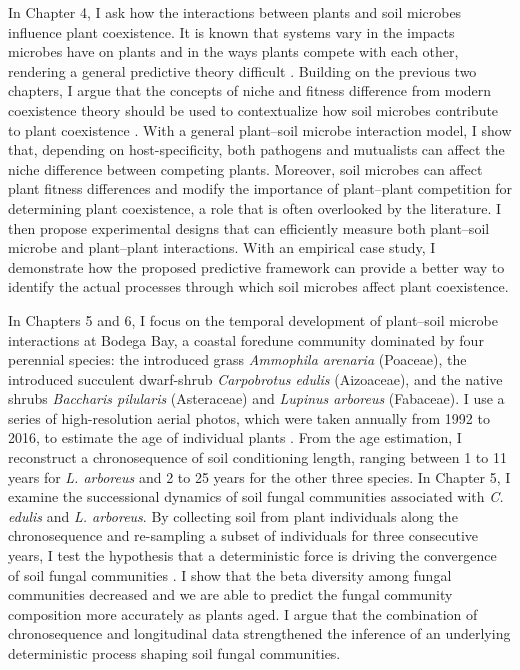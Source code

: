 In Chapter 4, I ask how the interactions between plants and soil microbes influence plant coexistence. It is known that systems vary in the impacts microbes have on plants and in the ways plants compete with each other, rendering a general predictive theory difficult \citep{Lekberg2018}. Building on the previous two chapters, I argue that the concepts of niche and fitness difference from modern coexistence theory should be used to contextualize how soil microbes contribute to plant coexistence \citep{KeMiki2015}. 
With a general plant--soil microbe interaction model, I show that, depending on host-specificity, both pathogens and mutualists can affect the niche difference between competing plants. Moreover, soil microbes can affect plant fitness differences and modify the importance of plant--plant competition for determining plant coexistence, a role that is often overlooked by the literature. I then propose experimental designs that can efficiently measure both plant--soil microbe and plant--plant interactions. With an empirical case study, I demonstrate how the proposed predictive framework can provide a better way to identify the actual processes through which soil microbes affect plant coexistence.
\par


In Chapters 5 and 6, I focus on the temporal development of plant--soil microbe interactions at Bodega Bay, a coastal foredune community dominated by four perennial species: the introduced grass \textit{Ammophila arenaria} (Poaceae), the introduced succulent dwarf-shrub \textit{Carpobrotus edulis} (Aizoaceae), and the native shrubs \textit{Baccharis pilularis} (Asteraceae) and \textit{Lupinus arboreus} (Fabaceae). I use a series of high-resolution aerial photos, which were taken annually from 1992 to 2016, to estimate the age of individual plants \citep{Danin1998}. From the age estimation, I reconstruct a chronosequence of soil conditioning length, ranging between 1 to 11 years for \textit{L. arboreus} and 2 to 25 years for the other three species.
In Chapter 5, I examine the successional dynamics of soil fungal communities associated with \textit{C. edulis} and \textit{L. arboreus}. By collecting soil from plant individuals along the chronosequence and re-sampling a subset of individuals for three consecutive years, I test the hypothesis that a deterministic force is driving the convergence of soil fungal communities \citep{Connell1977, DiniAndreote2015, Li2016}. 
I show that the beta diversity among fungal communities decreased and we are able to predict the fungal community composition more accurately as plants aged. I argue that the combination of chronosequence and longitudinal data strengthened the inference of an underlying deterministic process shaping soil fungal communities.
\par 


